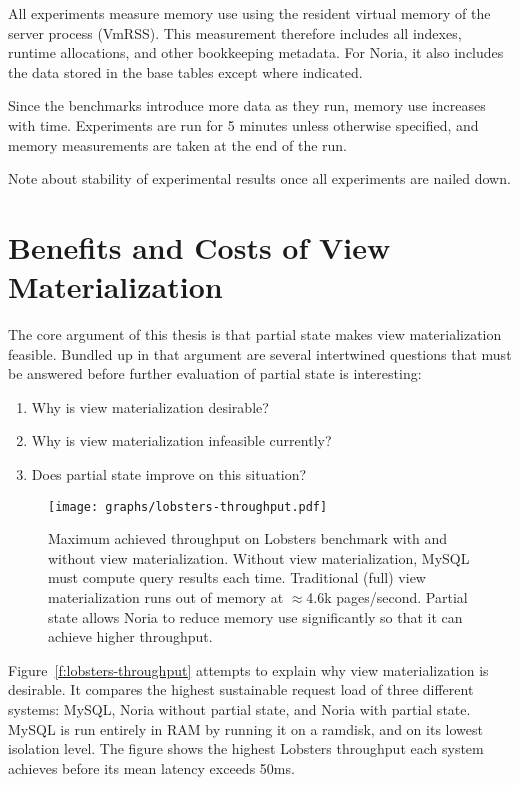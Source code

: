 All experiments measure memory use using the resident virtual memory of the
server process (VmRSS). This measurement therefore includes all indexes, runtime
allocations, and other bookkeeping metadata. For Noria, it also includes the
data stored in the base tables except where indicated.

Since the benchmarks introduce more data as they run, memory use increases with
time. Experiments are run for 5 minutes unless otherwise specified, and memory
measurements are taken at the end of the run.

\begin{inprogress}
  Note about stability of experimental results once all experiments are nailed
  down.
\end{inprogress}

\section{Benefits and Costs of View Materialization}
\label{s:eval:why}

The core argument of this thesis is that partial state makes view
materialization feasible. Bundled up in that argument are several intertwined
questions that must be answered before further evaluation of partial state is
interesting:

\begin{enumerate}
    \item Why is view materialization desirable?
    \item Why is view materialization infeasible currently?
    \item Does partial state improve on this situation?
\end{enumerate}

\begin{figure}[h]
  \centering
  \texttt{[image: graphs/lobsters-throughput.pdf]}
  \caption{Maximum achieved throughput on Lobsters benchmark with and without
  view materialization. Without view materialization, MySQL must compute query
  results each time. Traditional (full) view materialization runs out of memory
  at $\approx$4.6k pages/second. Partial state allows Noria to reduce memory use
  significantly so that it can achieve higher throughput.}
  \label{f:lobsters-throughput}
\end{figure}

Figure~\vref{f:lobsters-throughput} attempts to explain why view materialization
is desirable. It compares the highest sustainable request load of three
different systems: MySQL, Noria without partial state, and Noria with partial
state. MySQL is run entirely in RAM by running it on a ramdisk, and on its
lowest isolation level. The figure shows the highest Lobsters throughput each
system achieves before its mean latency exceeds 50ms.

